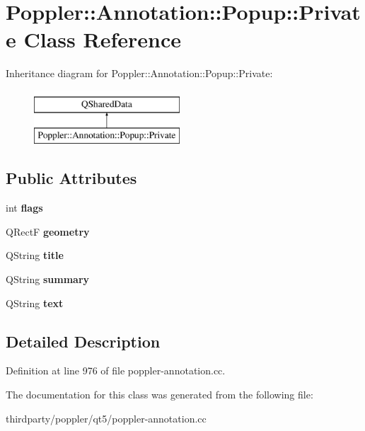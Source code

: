 \hypertarget{class_poppler_1_1_annotation_1_1_popup_1_1_private}{}\section{Poppler\+:\+:Annotation\+:\+:Popup\+:\+:Private Class Reference}
\label{class_poppler_1_1_annotation_1_1_popup_1_1_private}
Inheritance diagram for Poppler\+:\+:Annotation\+:\+:Popup\+:\+:Private\+:\begin{figure}[H]
\begin{center}
\leavevmode
\includegraphics[height=2.000000cm]{class_poppler_1_1_annotation_1_1_popup_1_1_private}
\end{center}
\end{figure}
\subsection*{Public Attributes}
\begin{DoxyCompactItemize}
\item 
\mbox{\label{class_poppler_1_1_annotation_1_1_popup_1_1_private_a674cbd37df4d1bd089476b9837215f51}} 
int {\bfseries flags}
\item 
\mbox{\label{class_poppler_1_1_annotation_1_1_popup_1_1_private_aa0e8d3c54251b7bfabafe8d0137ba801}} 
Q\+RectF {\bfseries geometry}
\item 
\mbox{\label{class_poppler_1_1_annotation_1_1_popup_1_1_private_a6acbf1accbca38b48d6c940df58d3efb}} 
Q\+String {\bfseries title}
\item 
\mbox{\label{class_poppler_1_1_annotation_1_1_popup_1_1_private_aa1a24384b15949868310b97a42f8722f}} 
Q\+String {\bfseries summary}
\item 
\mbox{\label{class_poppler_1_1_annotation_1_1_popup_1_1_private_ae906b2bd24eebe34c606851d1e4b71ed}} 
Q\+String {\bfseries text}
\end{DoxyCompactItemize}


\subsection{Detailed Description}


Definition at line 976 of file poppler-\/annotation.\+cc.



The documentation for this class was generated from the following file\+:\begin{DoxyCompactItemize}
\item 
thirdparty/poppler/qt5/poppler-\/annotation.\+cc\end{DoxyCompactItemize}
